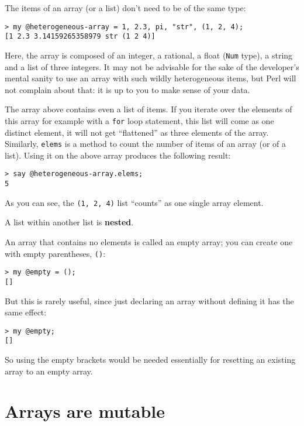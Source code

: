 The items of an array (or a list) don't need to be of the 
same type:

\begin{verbatim}
> my @heterogeneous-array = 1, 2.3, pi, "str", (1, 2, 4);
[1 2.3 3.14159265358979 str (1 2 4)]
\end{verbatim}

Here, the array is composed of an integer, a rational, a 
float ({\tt Num} type), a string and a list of three integers. 
It may not be advisable for the sake of the developer's 
mental sanity to use an array with such wildly heterogeneous 
items, but Perl will not complain about that: it is up 
to you to make sense of your data.

The array above contains even a list of items. If you iterate 
over the elements of this array for example with a {\tt for} 
loop statement, this list will come as one distinct element, 
it will not get ``flattened'' as three elements 
of the array. Similarly, {\tt elems} is a method to 
count the number of items of an array (or of a list). 
Using it on the above array produces the following result:

\begin{verbatim}
> say @heterogeneous-array.elems;
5
\end{verbatim}
%

As you can see, the \verb'(1, 2, 4)' list ``counts'' 
as one single array element.

A list within another list is {\bf nested}.

An array that contains no elements is
called an empty array; you can create one with empty
parentheses, \verb"()":
\begin{verbatim}
> my @empty = ();
[]
\end{verbatim}

But this is rarely useful, since just declaring an array 
without defining it has the same effect:

\begin{verbatim}
> my @empty;
[]
\end{verbatim}

So using the empty brackets would be needed essentially for 
resetting an existing array to an empty array.


\section{Arrays are mutable}
\label{mutable}

